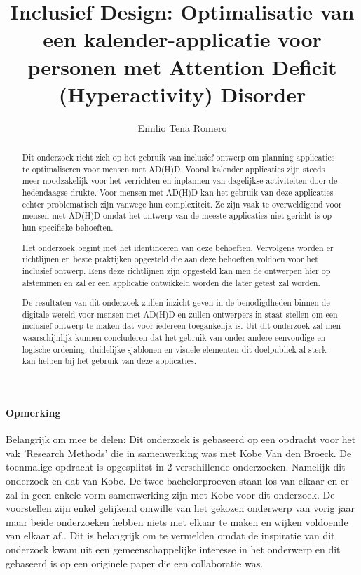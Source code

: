 \documentclass{hogent-article}
\title{Inclusief Design: Optimalisatie van een kalender-applicatie voor personen met Attention Deficit (Hyperactivity) Disorder}
\author{Emilio Tena Romero}
\begin{document}
\begin{abstract}
  Dit onderzoek richt zich op het gebruik van inclusief ontwerp om planning applicaties te optimaliseren voor mensen met AD(H)D. Vooral kalender applicaties zijn steeds meer noodzakelijk voor het verrichten en inplannen van dagelijkse activiteiten door de hedendaagse drukte. Voor mensen met AD(H)D kan het gebruik van deze applicaties echter problematisch zijn vanwege hun complexiteit. Ze zijn vaak te overweldigend voor mensen met AD(H)D omdat het ontwerp van de meeste applicaties niet gericht is op hun specifieke behoeften. 
  
  Het onderzoek begint met het identificeren van deze behoeften. Vervolgens worden er richtlijnen en beste praktijken opgesteld die aan deze behoeften voldoen voor het inclusief ontwerp. Eens deze richtlijnen zijn opgesteld kan men de ontwerpen hier op afstemmen en zal er een applicatie ontwikkeld worden die later getest zal worden.
  
  De resultaten van dit onderzoek zullen inzicht geven in de benodigdheden binnen de digitale wereld voor mensen met AD(H)D en zullen ontwerpers in staat stellen om een inclusief ontwerp te maken dat voor iedereen toegankelijk is. Uit dit onderzoek zal men waarschijnlijk kunnen concluderen dat het gebruik van onder andere eenvoudige en logische ordening, duidelijke sjablonen en visuele elementen dit doelpubliek al sterk kan helpen bij het gebruik van deze applicaties.
\end{abstract}

\tableofcontents


\paragraph{Opmerking}
Belangrijk om mee te delen: \newline
Dit onderzoek is gebaseerd op een opdracht voor het vak 'Research Methods' die in samenwerking was met Kobe Van den Broeck.
De toenmalige opdracht is opgesplitst in 2 verschillende onderzoeken. Namelijk dit onderzoek en dat van Kobe. 
\newline \newline
De twee bachelorproeven staan los van elkaar en er zal in geen enkele vorm samenwerking zijn met Kobe voor dit onderzoek. De voorstellen zijn enkel gelijkend omwille van het gekozen onderwerp van vorig jaar maar beide onderzoeken hebben niets met elkaar te maken en wijken voldoende van elkaar af..
\newline \newline
Dit is belangrijk om te vermelden omdat de inspiratie van dit onderzoek kwam uit een gemeenschappelijke interesse in het onderwerp en dit gebaseerd is op een originele paper die een collaboratie was.  



\printbibliography[heading=bibintoc]
\end{document}
